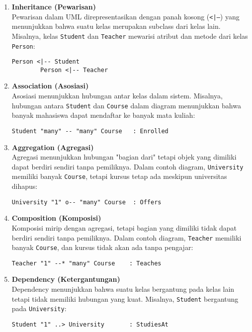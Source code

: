 \begin{enumerate}
	\item \textbf{Inheritance (Pewarisan)} \\
	Pewarisan dalam UML direpresentasikan dengan panah kosong (\texttt{<|--}) yang menunjukkan bahwa suatu kelas merupakan subclass dari kelas lain. Misalnya, kelas \texttt{Student} dan \texttt{Teacher} mewarisi atribut dan metode dari kelas \texttt{Person}:
	\begin{lstlisting}[language=puml]
		Person <|-- Student  
		Person <|-- Teacher
	\end{lstlisting}
	
	\item \textbf{Association (Asosiasi)} \\
	Asosiasi menunjukkan hubungan antar kelas dalam sistem. Misalnya, hubungan antara \texttt{Student} dan \texttt{Course} dalam diagram menunjukkan bahwa banyak mahasiswa dapat mendaftar ke banyak mata kuliah:
	\begin{lstlisting}[language=puml]
		Student "many" -- "many" Course   : Enrolled
	\end{lstlisting}
	
	\item \textbf{Aggregation (Agregasi)} \\
	Agregasi menunjukkan hubungan "bagian dari" tetapi objek yang dimiliki dapat berdiri sendiri tanpa pemiliknya. Dalam contoh diagram, \texttt{University} memiliki banyak \texttt{Course}, tetapi kursus tetap ada meskipun universitas dihapus:
	\begin{lstlisting}[language=puml]
		University "1" o-- "many" Course  : Offers
	\end{lstlisting}
	
	\item \textbf{Composition (Komposisi)} \\
	Komposisi mirip dengan agregasi, tetapi bagian yang dimiliki tidak dapat berdiri sendiri tanpa pemiliknya. Dalam contoh diagram, \texttt{Teacher} memiliki banyak \texttt{Course}, dan kursus tidak akan ada tanpa pengajar:
	\begin{lstlisting}[language=puml]
		Teacher "1" --* "many" Course    : Teaches
	\end{lstlisting}
	
	\item \textbf{Dependency (Ketergantungan)} \\
	Dependency menunjukkan bahwa suatu kelas bergantung pada kelas lain tetapi tidak memiliki hubungan yang kuat. Misalnya, \texttt{Student} bergantung pada \texttt{University}:
	\begin{lstlisting}[language=puml]
		Student "1" ..> University       : StudiesAt
	\end{lstlisting}
\end{enumerate}

